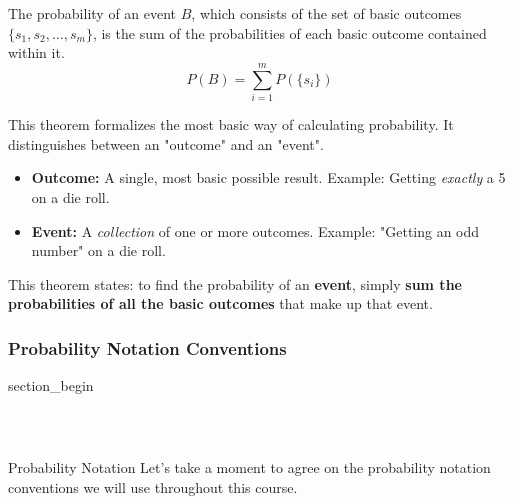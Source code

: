 \begin{frame}[t]
\frametitle{\ }
  \vspace{-8mm}
  \footnotesize
  \begin{Teorema}
    The probability of an event $B$, which consists of the set of basic outcomes $\{s_1, s_2, \dots, s_m\}$, is the sum of the probabilities of each basic outcome contained within it.
    \[
      P(B) = \sum_{i=1}^{m} P(\{s_i\})
    \]
  \end{Teorema}
  
  \vfill
  \vspace{-5mm}

    \begin{block}{}
    This theorem formalizes the most basic way of calculating probability. It distinguishes between an "outcome" and an "event".
    \begin{itemize}
        \item \textbf{Outcome:} A single, most basic possible result. Example: Getting \textit{exactly} a 5 on a die roll.
        \item \textbf{Event:} A \textit{collection} of one or more outcomes. Example: "Getting an odd number" on a die roll.
    \end{itemize}
    
    This theorem states: to find the probability of an \textbf{event}, simply \textbf{sum the probabilities of all the basic outcomes} that make up that event.
  \end{block}
  
\end{frame}

\subsubsection{Probability Notation Conventions}
\begin{frame} \vfill \centering \begin{beamercolorbox}[sep=10pt,center,shadow=false,rounded=true]{section_begin} \insertsubsubsectionhead\par \end{beamercolorbox} \vfill \end{frame}
\begin{frame}[t]
\frametitle{\ }
\begin{alertblock}{Probability Notation}
    Let's take a moment to agree on the probability notation conventions we will use throughout this course.
\end{alertblock}    
\end{frame}

